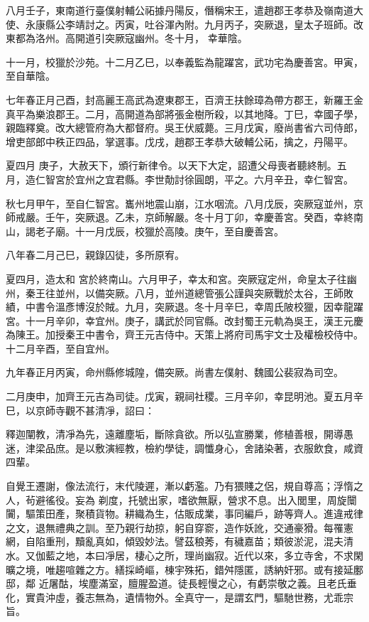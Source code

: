 \begin{pinyinscope}
 八月壬子，東南道行臺僕射輔公祏據丹陽反，僭稱宋王，遣趙郡王孝恭及嶺南道大使、永康縣公李靖討之。丙寅，吐谷渾內附。九月丙子，突厥退，皇太子班師。改東都為洛州。高開道引突厥寇幽州。冬十月，
 幸華陰。



 十一月，校獵於沙苑。十二月乙巳，以奉義監為龍躍宮，武功宅為慶善宮。甲寅，至自華陰。



 七年春正月己酉，封高麗王高武為遼東郡王，百濟王扶餘璋為帶方郡王，新羅王金真平為樂浪郡王。二月，高開道為部將張金樹所殺，以其地降。丁巳，幸國子學，親臨釋奠。改大總管府為大都督府。吳王伏威薨。三月戊寅，廢尚書省六司侍郎，增吏部郎中秩正四品，掌選事。戊戌，趙郡王孝恭大破輔公祏，擒之，丹陽平。



 夏四月
 庚子，大赦天下，頒行新律令。以天下大定，詔遭父母喪者聽終制。五月，造仁智宮於宜州之宜君縣。李世勣討徐圓朗，平之。六月辛丑，幸仁智宮。



 秋七月甲午，至自仁智宮。巂州地震山崩，江水咽流。八月戊辰，突厥寇並州，京師戒嚴。壬午，突厥退。乙未，京師解嚴。冬十月丁卯，幸慶善宮。癸酉，幸終南山，謁老子廟。十一月戊辰，校獵於高陵。庚午，至自慶善宮。



 八年春二月己巳，親錄囚徒，多所原宥。



 夏四月，造太和
 宮於終南山。六月甲子，幸太和宮。突厥寇定州，命皇太子往幽州，秦王往並州，以備突厥。八月，並州道總管張公謹與突厥戰於太谷，王師敗績，中書令溫彥博沒於賊。九月，突厥退。冬十月辛巳，幸周氏陂校獵，因幸龍躍宮。十一月辛卯，幸宜州。庚子，講武於同官縣。改封蜀王元軌為吳王，漢王元慶為陳王。加授秦王中書令，齊王元吉侍中。天策上將府司馬宇文士及權檢校侍中。十二月辛酉，至自宜州。



 九年春正月丙寅，命州縣修城隍，備突厥。尚書左僕射、魏國公裴寂為司空。



 二月庚申，加齊王元吉為司徒。戊寅，親祠社稷。三月辛卯，幸昆明池。夏五月辛巳，以京師寺觀不甚清凈，詔曰：



 釋迦闡教，清凈為先，遠離塵垢，斷除貪欲。所以弘宣勝業，修植善根，開導愚迷，津梁品庶。是以敷演經教，檢約學徒，調懺身心，舍諸染著，衣服飲食，咸資四輩。



 自覺王遷謝，像法流行，末代陵遲，漸以虧濫。乃有猥賤之侶，規自尊高；浮惰之人，茍避徭役。妄為
 剃度，托號出家，嗜欲無厭，營求不息。出入閭里，周旋闤闠，驅策田產，聚積貨物。耕織為生，估販成業，事同編戶，跡等齊人。進違戒律之文，退無禮典之訓。至乃親行劫掠，躬自穿窬，造作妖訛，交通豪猾。每罹憲網，自陷重刑，黷亂真如，傾毀妙法。譬茲稂莠，有穢嘉苗；類彼淤泥，混夫清水。又伽藍之地，本曰凈居，棲心之所，理尚幽寂。近代以來，多立寺舍，不求閑曠之境，唯趨喧雜之方。繕採崎嶇，棟宇殊拓，錯舛隱匿，誘納奸邪。或有接延鄽邸，鄰
 近屠酤，埃塵滿室，膻腥盈道。徒長輕慢之心，有虧崇敬之義。且老氏垂化，實貴沖虛，養志無為，遺情物外。全真守一，是謂玄門，驅馳世務，尤乖宗旨。




\end{pinyinscope}
